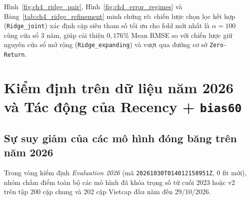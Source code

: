 \documentclass[12pt,a4paper]{report}
\begin{document}
\begin{table}[!htbp]
\centering
\caption[Đối chứng các cấu hình Ridge]{Tổng hợp hiệu năng Walk-Forward của các chiến lược chọn lọc Ridge}
\label{tab:ch4_ridge_refinement}
\renewcommand{\arraystretch}{1.18}
\small
\setlength{\tabcolsep}{4.5pt}%
\end{table}

Hình~\ref{fig:ch4_ridge_pair}, Hình~\ref{fig:ch4_error_regimes} và Bảng~\ref{tab:ch4_ridge_refinement} minh chứng rõ: chiến lược chọn lọc kết hợp (\nolinkurl{Ridge_joint}) xác định cặp siêu tham số tối ưu cho fold mới nhất là $\alpha = 100$ cùng cửa sổ $3$ năm, giúp cải thiện $0,176\%$ Mean RMSE so với chiến lược giữ nguyên cửa sổ mở rộng (\nolinkurl{Ridge_expanding}) và vượt qua đường cơ sở \nolinkurl{Zero-Return}.

\section{Kiểm định trên dữ liệu năm 2026 và Tác động của Recency + \texttt{bias60}}

\subsection{Sự suy giảm của các mô hình đóng băng trên năm 2026}
Trong vòng kiểm định \textit{Evaluation 2026} (mã \texttt{20261030T\-014012158951Z}, 0 fit mới), nhóm chấm điểm toàn bộ các mô hình đã khóa trọng số từ cuối 2023 hoặc v2 trên tập 200 cặp chung và 202 cặp Vietcap đầu năm đến 29/10/2026.
\end{document}
